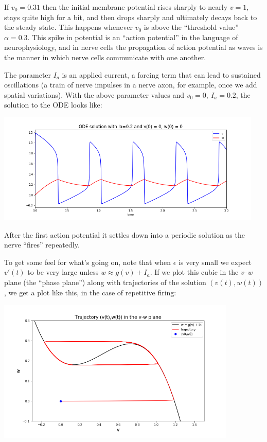 \documentclass[10pt]{article}
\begin{document}
If $v_0=0.31$ then the initial membrane potential rises sharply to nearly
$v=1$, stays quite high for a bit, and then drops sharply and ultimately
decays back to the steady state.  This happens whenever $v_0$ is above the
``threshold value'' $\alpha = 0.3$.  This spike in potential is an ``action
potential'' in the language of neurophysiology, and in nerve cells the
propagation of action potential as waves is the manner in which nerve cells
communicate with one another.

The parameter $I_a$ is an applied current, a forcing term that can lead to
sustained oscillations (a train of nerve impulses in a nerve axon, for
example, once we add spatial variations).  
With the above parameter values and $v_0=0,~I_a=0.2$, the solution to
the ODE  looks like:

\vskip 5pt
\hfil\includegraphics[width=5.0in]{Ia2.png}\hfil
\vskip 5pt

After the first action potential it settles down into a periodic
solution as the nerve ``fires'' repeatedly.

\newpage

To get some feel for what's going on, note that when $\epsilon$ is very small
we expect $v'(t)$ to be very large unless $w \approx g(v) + I_a$.  If we 
plot this cubic in the $v$--$w$ plane (the ``phase plane'') along with 
trajectories of the solution $(v(t), w(t))$, we get a plot like this, in
the case of repetitive firing:

\vskip 5pt
\hfil\includegraphics[width=4.5in]{FHtrajectory.png}\hfil
\vskip 5pt
\end{document}
